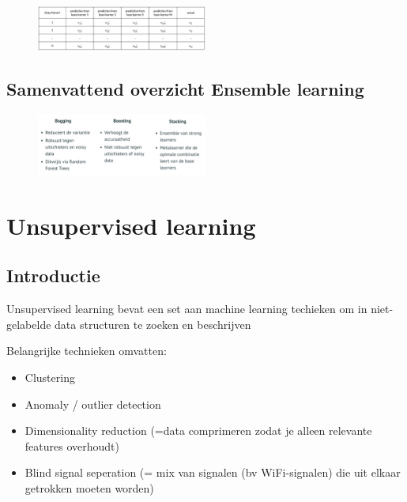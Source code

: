 \documentclass{article}
\begin{document}
\subsubsection{}

\begin{figure}[H]
    \centering
    \includegraphics[width=0.5\textwidth]{stacking4.png}
    \caption{}
\end{figure}

\subsection{Samenvattend overzicht Ensemble learning}

\begin{figure}[H]
    \centering
    \includegraphics[width=0.5\textwidth]{ensemble-learning-overzicht.png}
\end{figure}

\section{Unsupervised learning}

\subsection{Introductie}

Unsupervised learning bevat een set aan machine learning techieken om in
niet-gelabelde data structuren te zoeken en beschrijven

Belangrijke technieken omvatten:

\begin{itemize}
    \item Clustering
    \item Anomaly / outlier detection
    \item Dimensionality reduction (=data comprimeren zodat je alleen relevante features overhoudt)
    \item Blind signal seperation (= mix van signalen (bv WiFi-signalen) die uit elkaar getrokken moeten worden)
\end{itemize}
\end{document}
